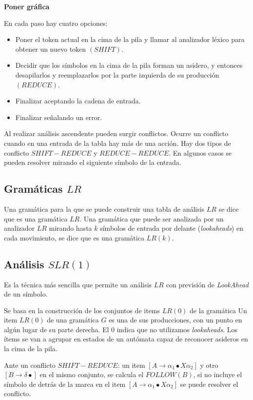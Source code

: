                 \textbf{Poner gráfica}
                 
En cada paso hay cuatro opciones:
\begin{itemize}
	\item Poner el token actual en la cima de la pila y llamar al analizador léxico para obtener un nuevo token $(SHIFT)$.
	\item Decidir que los símbolos en la cima de la pila forman un asidero, y entonces desapilarlos y reemplazarlos por la parte izquierda de su producción $(REDUCE)$.
	\item Finalizar aceptando la cadena de entrada.
	\item Finalizar señalando un error.
\end{itemize}

Al realizar análisis ascendente pueden surgir conflictos. Ocurre un conflicto cuando en una entrada de la tabla hay más de una acción. Hay dos tipos de conflicto $SHIFT-REDUCE$ y $REDUCE-REDUCE$. En algunos casos se pueden resolver mirando el siguiente símbolo de la entrada.

\subsection{Gramáticas  $LR$}

Una gramática para la que se puede construir una tabla de análisis $LR$ se dice que es una gramática $LR$. Una gramática que puede ser analizada por un analizador $LR$ mirando hasta $k$ símbolos de entrada por delante (\textit{lookaheads}) en cada movimiento, se dice que es una gramática $LR(k)$.

\subsection{Análisis $SLR(1)$}

Es la técnica más sencilla que permite un análisis $LR$ con previsión de \textit{LookAhead} de un símbolo.

Se basa en la construcción de los conjuntos de items $LR(0)$ de la gramática
Un item $LR(0)$ de una gramática $G$ es una de sus producciones, con un punto en algún lugar de su parte derecha. El 0 indica que no utilizamos \textit{lookaheads}.
Los ítems se van a agrupar en estados de un autómata capaz de reconocer asideros en la cima de la pila.



Ante un conflicto $SHIFT-REDUCE$: un item $[A\rightarrow\alpha_{1}\bullet X\alpha_{2} ]$ y otro $[B\rightarrow\delta\bullet ]$ en el mismo conjunto, se calcula el $FOLLOW(B)$, si no incluye el símbolo de detrás de la marca en el item $[A\rightarrow\alpha_{1}\bullet X\alpha_{2}]$ se puede resolver el conflicto.

